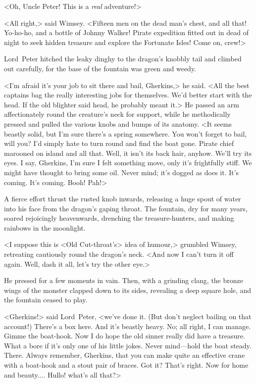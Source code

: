 <Oh, Uncle Peter! This is a \emph{real} adventure!>

<All right,> said Wimsey. <Fifteen men on the dead man's chest, and all that! Yo-ho-ho, and a bottle of Johnny Walker! Pirate expedition fitted out in dead of night to seek hidden treasure and explore the Fortunate Isles! Come on, crew!>

\divider
Lord~Peter hitched the leaky dinghy to the dragon's knobbly tail and climbed out carefully, for the base of the fountain was green and weedy.

<I'm afraid it's your job to sit there and bail, Gherkins,> he said. <All the best captains bag the really interesting jobs for themselves. We'd better start with the head. If the old blighter said head, he probably meant it.> He passed an arm affectionately round the creature's neck for support, while he methodically pressed and pulled the various knobs and bumps of its anatomy. <It seems beastly solid, but I'm sure there's a spring somewhere. You won't forget to bail, will you? I'd simply hate to turn round and find the boat gone. Pirate chief marooned on island and all that. Well, it isn't its back hair, anyhow. We'll try its eyes. I say, Gherkins, I'm sure I felt something move, only it's frightfully stiff. We might have thought to bring some oil. Never mind; it's dogged as does it. It's coming. It's coming. Booh! Pah!>

A fierce effort thrust the rusted knob inwards, releasing a huge spout of water into his face from the dragon's gaping throat. The fountain, dry for many years, soared rejoicingly heavenwards, drenching the treasure-hunters, and making rainbows in the moonlight.

<I suppose this is <Old Cut-throat's> idea of humour,> grumbled Wimsey, retreating cautiously round the dragon's neck. <And now I can't turn it off again. Well, dash it all, let's try the other eye.>

He pressed for a few moments in vain. Then, with a grinding clang, the bronze wings of the monster clapped down to its sides, revealing a deep square hole, and the fountain ceased to play.

<Gherkins!> said Lord~Peter, <we've done it. (But don't neglect bailing on that account!) There's a box here. And it's beastly heavy. No; all right, I can manage. Gimme the boat-hook. Now I do hope the old sinner really did have a treasure. What a bore if it's only one of his little jokes. Never mind—hold the boat steady. There. Always remember, Gherkins, that you can make quite an effective crane with a boat-hook and a stout pair of braces. Got it? That's right. Now for home and beauty.... Hullo! what's all that?>

